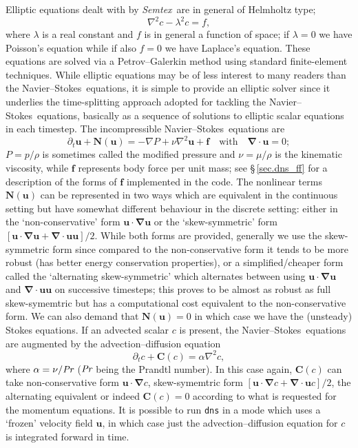\documentclass[11pt]{report}
\def\Pr{\mbox{\it Pr}}                              %
\newcommand{\Semtex}{\emph{Semtex}} \newcommand{\Dog}{\emph{Dog}}
\newcommand\NavSto{Navier--Stokes}
\begin{document}
Elliptic equations dealt with by \Semtex\ are in general of Helmholtz
type;
\[
\nabla^2 c - \lambda^2 c = f,
\]
where $\lambda$ is a real constant and $f$ is in general a function of
space; if $\lambda=0$ we have Poisson's equation while if also $f=0$
we have Laplace's equation.  These equations are solved via a
Petrov--Galerkin method using standard finite-element techniques.
While elliptic equations may be of less interest to many readers than
the \NavSto\ equations, it is simple to provide an elliptic solver
since it underlies the time-splitting approach adopted for tackling
the \NavSto\ equations, \ie basically as a sequence of solutions to
elliptic scalar equations in each timestep.
%
The incompressible \NavSto\ equations are
\[
\partial_t\bm{u}+\bm{N}(\bm{u}) = -\nabla P + \nu\nabla^2\bm{u} + \bm{f}
\quad\text{with}\quad
\bm{\nabla\cdot u} = 0; 
\]
$P=p/\rho$ is sometimes called the modified pressure and
$\nu=\mu/\rho$ is the kinematic viscosity, while $\bm{f}$ represents
body force per unit mass; see \S\,\ref{sec.dns_ff} for a description
of the forms of $\bm{f}$ implemented in the code.  The nonlinear terms
$\bm{N}(\bm{u})$ can be represented in two ways which are equivalent
in the continuous setting but have somewhat different behaviour in the
discrete setting: either in the `non-conservative' form
$\bm{u\cdot\nabla u}$ or the `skew-symmetric' form $[\bm{u\cdot\nabla
    u} + \bm{\nabla\cdot uu}]/2$.
%
While both forms are provided, generally we use the skew-symmetric
form since compared to the non-conservative form it tends to be more
robust (has better energy conservation properties), or a
simplified/cheaper form called the `alternating skew-symmetric' which
alternates between using $\bm{u\cdot\nabla u}$ and $\bm{\nabla\cdot
  uu}$ on successive timesteps; this proves to be almost as robust as
full skew-symemtric but has a computational cost equivalent to the
non-conservative form.  We can also demand that $\bm{N}(\bm{u}) = 0$
in which case we have the (unsteady) Stokes equations.
%
If an advected scalar $c$ is present, the \NavSto\ equations are
augmented by the advection--diffusion equation
\[
\partial_t c + \bm{C}(c) = \alpha\nabla^2 c,
\]
where $\alpha = \nu/\Pr$ ($\Pr$ being the Prandtl number).  In this
case again, $\bm{C}(c)$ can take non-conservative form
$\bm{u\cdot\nabla}c$, skew-symemtric form $[\bm{u\cdot\nabla}c +
  \bm{\nabla\cdot u}c]/2$, the alternating equivalent or indeed
$\bm{C}(c)=0$ according to what is requested for the momentum
equations.  It is possible to run \verb|dns| in a mode which uses a
`frozen' velocity field $\bm{u}$, in which case just the
advection--diffusion equation for $c$ is integrated forward in time.
\end{document}
